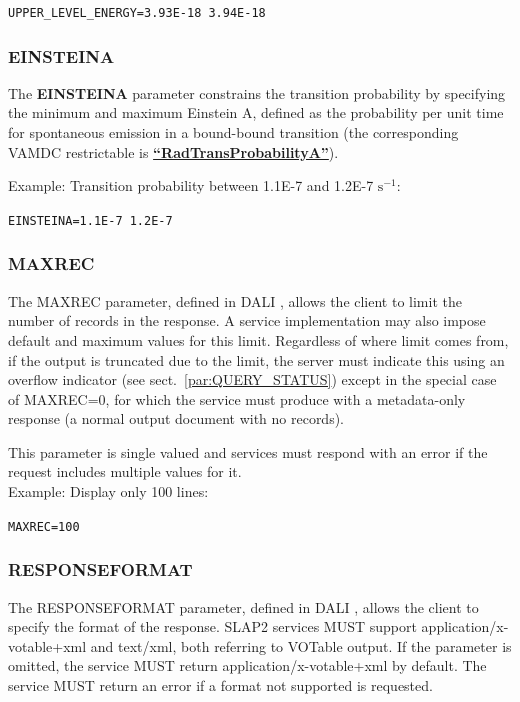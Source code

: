 \documentclass[11pt,a4paper]{ivoa}
\def\vamdcres#1{\href{https://dictionary.vamdc.eu/restrictables/\##1}{\textbf{``\color{vamdccolor}#1''}}}
\newcommand{\parexample}[1]{\noindent\quad\texttt{#1}}
\begin{document}
\parexample{UPPER\_LEVEL\_ENERGY=3.93E-18 3.94E-18}


\subsubsection{EINSTEINA}

The \textbf{EINSTEINA} parameter constrains the
transition probability by specifying the minimum and maximum Einstein A, defined as the probability
per unit time for spontaneous emission in a bound-bound
transition (the corresponding VAMDC restrictable is \vamdcres{RadTransProbabilityA}).

Example: Transition probability between 1.1E-7 and 1.2E-7 $\textrm{s}^{-1}$:

\parexample{EINSTEINA=1.1E-7 1.2E-7}

\subsubsection{MAXREC}
\label{sect:lines-maxrec}

The MAXREC parameter, defined in DALI \citep{2017ivoa.spec.0517D}, allows the client to
limit the number of records in the response. A service implementation
may also impose default and maximum values for this limit. Regardless of
where limit comes from,
if the output is truncated due to the limit, the
server must indicate this using an overflow indicator (see sect.~\ref{par:QUERY_STATUS}) except in the special
case of MAXREC=0, for which the service must produce with a metadata-only response (a normal output document with no records).

This parameter is single valued and services must respond with an error if
the request includes multiple values for it.\\

Example: Display only 100 lines:

\parexample{MAXREC=100}

\subsubsection{RESPONSEFORMAT}
\label{sect:lines-responseformat}

The RESPONSEFORMAT parameter, defined in DALI \citep{2017ivoa.spec.0517D}, allows the client to specify the format
of the response. SLAP2 services MUST support application/x-votable+xml and text/xml,
both referring to VOTable output. If the parameter is omitted, the service MUST return application/x-votable+xml by default.
The service MUST return an error if a format not supported is requested.
\end{document}
